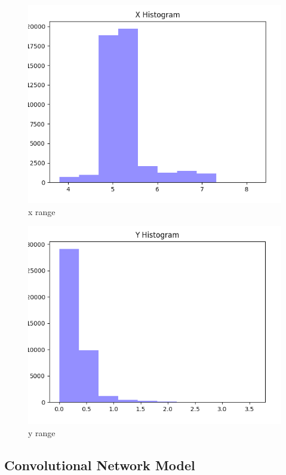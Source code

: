\documentclass[12pt, a4paper, twocolumn, fullpage]{article}
\theoremstyle{plain}
\theoremstyle{definition}
\theoremstyle{remark}
\begin{document}
\begin{figure}
    \includegraphics[width=\linewidth]{xhist.png}
    \caption{x range}
    \label{xhist}
\end{figure}

\begin{figure}
    \includegraphics[width=\linewidth]{yhist.png}
    \caption{y range}
    \label{yhist}
\end{figure}

\subsection{Convolutional Network Model}
\end{document}
